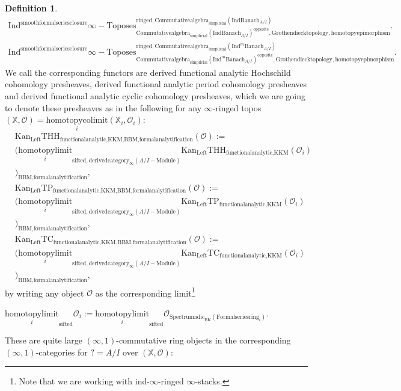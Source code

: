 \documentclass[11pt]{book}
\theoremstyle{definition}
\newtheorem{definition}[theorem]{Definition}
\numberwithin{equation}{section}
\begin{document}
\begin{definition}
\begin{align}
\mathrm{Ind}^\text{smoothformalseriesclosure}\infty-\mathrm{Toposes}^{\mathrm{ringed},\mathrm{Commutativealgebra}_{\mathrm{simplicial}}(\mathrm{Ind}\mathrm{Banach}_{A/I})}_{\mathrm{Commutativealgebra}_{\mathrm{simplicial}}(\mathrm{Ind}\mathrm{Banach}_{A/I})^\mathrm{opposite},\mathrm{Grothendiecktopology,homotopyepimorphism}}.\\
\mathrm{Ind}^\text{smoothformalseriesclosure}\infty-\mathrm{Toposes}^{\mathrm{ringed},\mathrm{Commutativealgebra}_{\mathrm{simplicial}}(\mathrm{Ind}^m\mathrm{Banach}_{A/I})}_{\mathrm{Commutativealgebra}_{\mathrm{simplicial}}(\mathrm{Ind}^m\mathrm{Banach}_{A/I})^\mathrm{opposite},\mathrm{Grothendiecktopology,homotopyepimorphism}}. 
\end{align}
We call the corresponding functors are derived functional analytic Hochschild cohomology presheaves, derived functional analytic period cohomology presheaves and derived functional analytic cyclic cohomology presheaves, which we are going to denote these presheaves as in the following for any $\infty$-ringed topos $(\mathbb{X},\mathcal{O})=\underset{i}{\text{homotopycolimit}}(\mathbb{X}_i,\mathcal{O}_i)$:
\begin{align}
	&\mathrm{Kan}_{\mathrm{Left}}\mathrm{THH}_{\text{functionalanalytic,KKM},\text{BBM,formalanalytification}}(\mathcal{O}):=\\
	&(\underset{i}{\text{homotopylimit}}_{\text{sifted},\text{derivedcategory}_{\infty}(A/I-\text{Module})}\mathrm{Kan}_{\mathrm{Left}}\mathrm{THH}_{\text{functionalanalytic,KKM}}(\mathcal{O}_i)\\
	&)_\text{BBM,formalanalytification},\\
	&\mathrm{Kan}_{\mathrm{Left}}\mathrm{TP}_{\text{functionalanalytic,KKM},\text{BBM,formalanalytification}}(\mathcal{O}):=\\
	&(\underset{i}{\text{homotopylimit}}_{\text{sifted},\text{derivedcategory}_{\infty}(A/I-\text{Module})}\mathrm{Kan}_{\mathrm{Left}}\mathrm{TP}_{\text{functionalanalytic,KKM}}(\mathcal{O}_i)\\
	&)_\text{BBM,formalanalytification},\\
	&\mathrm{Kan}_{\mathrm{Left}}\mathrm{TC}_{\text{functionalanalytic,KKM},\text{BBM,formalanalytification}}(\mathcal{O}):=\\
	&(\underset{i}{\text{homotopylimit}}_{\text{sifted},\text{derivedcategory}_{\infty}(A/I-\text{Module})}\mathrm{Kan}_{\mathrm{Left}}\mathrm{TC}_{\text{functionalanalytic,KKM}}(\mathcal{O}_i)\\
	&)_\text{BBM,formalanalytification},
\end{align}
by writing any object $\mathcal{O}$ as the corresponding limit\footnote{Note that we are working with ind-$\infty$-ringed $\infty$-stacks.} 
\begin{center}
$\underset{i}{\text{homotopylimit}}_\text{sifted}\mathcal{O}_i:=\underset{i}{\text{homotopylimit}}_\text{sifted}\mathcal{O}_{\mathrm{Spectrumadic}_\mathrm{BK}(\mathrm{Formalseriesring}_i)}$.
\end{center}
These are quite large $(\infty,1)$-commutative ring objects in the corresponding $(\infty,1)$-categories for $?=A/I$ over $(\mathbb{X},\mathcal{O})$:


\end{definition}
\end{document}
